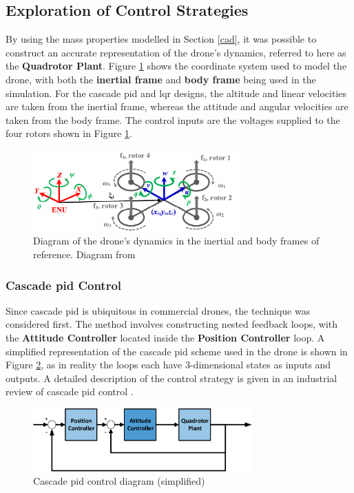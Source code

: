\subsection{Exploration of Control Strategies}

By using the mass properties modelled in Section \ref{cad}, it was possible to construct an accurate representation of the drone's dynamics, referred to here as the \textbf{Quadrotor Plant}. Figure \ref{fig:nekoodiag} shows the coordinate system used to model the drone, with both the \textbf{inertial frame} and \textbf{body frame} being used in the simulation. For the cascade \gls{pid} and \gls{lqr} designs, the altitude and linear velocities are taken from the inertial frame, whereas the attitude and angular velocities are taken from the body frame. The control inputs are the voltages supplied to the four rotors shown in Figure \ref{fig:nekoodiag}.


\begin{figure}[H]
\centering
\includegraphics[width=0.71\textwidth]{figs/Samuel/Figures/nekoodiagram-cropped.pdf}
\caption{Diagram of the drone's dynamics in the inertial and body frames of reference. Diagram from \cite{nekoo}}
\label{fig:nekoodiag}
\end{figure}

\subsubsection{Cascade \gls{pid} Control}
Since cascade \gls{pid} is ubiquitous in commercial drones, the technique was considered first. The method involves constructing nested feedback loops, with the \textbf{Attitude Controller} located inside the \textbf{Position Controller} loop. A simplified representation of the cascade \gls{pid} scheme used in the drone is shown in Figure \ref{fig:pidloop}, as in reality the loops each have 3-dimensional states as inputs and outputs. A detailed description of the control strategy is given in an industrial review of cascade \gls{pid} control \cite{electronics10040376}.

\begin{figure}[H]
\centering
\includegraphics[width=0.75\textwidth]{figs/Samuel/Figures/Control Loop-cropped.pdf}
\caption{Cascade \gls{pid} control diagram (simplified)}
\label{fig:pidloop}
\end{figure}




